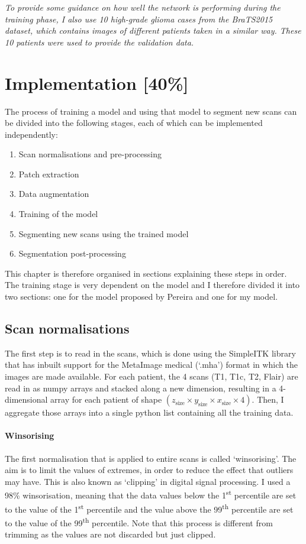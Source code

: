 \documentclass[12pt,a4paper,twoside,openright]{report}
\begin{document}
\textit{To provide some guidance on how well the network is performing during the training phase, I also use 10 high-grade glioma cases from the BraTS2015 dataset, which contains images of different patients taken in a similar way. These 10 patients were used to provide the validation data.}

\chapter{Implementation [40\%]}
The process of training a model and using that model to segment new scans can be divided into the following stages, each of which can be implemented  independently:
\begin{enumerate}
	\item Scan normalisations and pre-processing
	\item Patch extraction
	\item Data augmentation
	\item Training of the model
	\item Segmenting new scans using the trained model
	\item Segmentation post-processing
\end{enumerate}
This chapter is therefore organised in sections explaining these steps in order. The training stage is very dependent on the model and I therefore divided it into two sections: one for the model proposed by Pereira and one for my model.

\section{Scan normalisations}
\label{section:pre-processing}
The first step is to read in the scans, which is done using the SimpleITK library that has inbuilt support for the MetaImage medical (`.mha') format in which the images are made available. For each patient, the 4 scans (T1, T1c, T2, Flair) are read in as numpy arrays and stacked along a new dimension, resulting in a 4-dimensional array for each patient of shape $(z_{\text{size}} \times y_{\text{size}} \times x_{\text{size}} \times 4)$. Then, I aggregate those arrays into a single python list containing all the training data.

\subsubsection{Winsorising}
The first normalisation that is applied to entire scans is called `winsorising'. The aim is to limit the values of extremes, in order to reduce the effect that outliers may have. This is also known as `clipping' in digital signal processing. I used a 98\% winsorisation, meaning that the data values below the 1\textsuperscript{st} percentile are set to the value of the 1\textsuperscript{st} percentile and the value above the 99\textsuperscript{th} percentile are set to the value of the 99\textsuperscript{th} percentile. Note that this process is different from trimming as the values are not discarded but just clipped.
\end{document}
